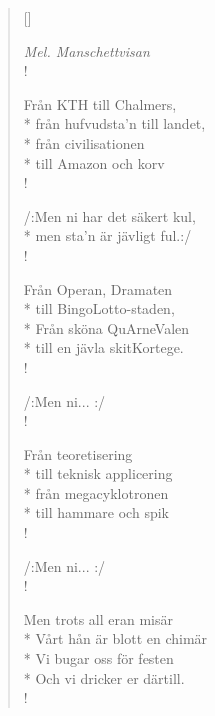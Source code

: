 \settowidth{\versewidth}{till Amazon och korv}


\begin{verse}[\versewidth]

\flagverse{}
\emph{Mel. Manschettvisan}\\!

Från KTH till Chalmers,\\*
från hufvudsta'n till landet,\\*
från civilisationen\\*
till Amazon och korv\\!


/:Men ni har det säkert kul,\\*
men sta'n är jävligt ful.:/\\!


Från Operan, Dramaten\\*
till BingoLotto-staden, \\*
Från sköna QuArneValen\\*
till en jävla skitKortege.\\!


/:Men ni... :/\\!


Från teoretisering\\*
till teknisk applicering\\*
från megacyklotronen\\*
till hammare och spik\\!


/:Men ni... :/\\!


Men trots all eran misär \\*
Vårt hån är blott en chimär \\*
Vi bugar oss för festen \\*
Och vi dricker er därtill.\\!




\end{verse}

